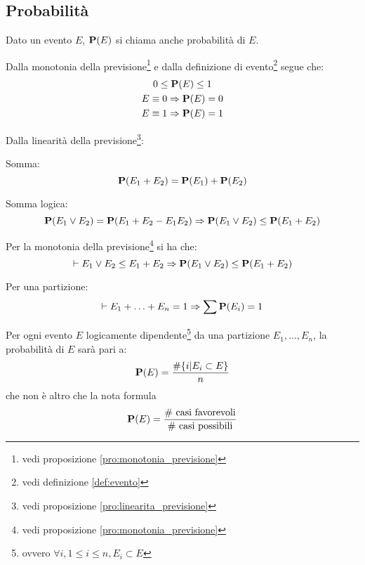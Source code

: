 \subsection{Probabilità}
\begin{definition}[Probabilità]\label{def:probabilita}
  Dato un evento \( E \), \( \mathbf{P}(E) \) si chiama anche probabilità di \( E \).
\end{definition}

\begin{proposition}
  Dalla monotonia della previsione\footnote{vedi proposizione \ref{pro:monotonia_previsione}} e dalla definizione di evento\footnote{vedi definizione \ref{def:evento}} segue che:
  \begin{gather*}
    0 \le \mathbf{P}(E) \le 1 \\
    E \equiv 0 \Rightarrow \mathbf{P}(E) = 0 \\
    E \equiv 1 \Rightarrow \mathbf{P}(E) = 1
  \end{gather*}
\end{proposition}

\begin{proposition}
  Dalla linearità della previsione\footnote{vedi proposizione \ref{pro:linearita_previsione}}:

  Somma:
  \[ \mathbf{P}(E_1 + E_2) = \mathbf{P}(E_1) + \mathbf{P}(E_2) \]

  Somma logica:
  \[ \mathbf{P}(E_1 \vee E_2) = \mathbf{P}(E_1 + E_2 - E_1 E_2) \Rightarrow \mathbf{P}(E_1 \vee E_2) \le \mathbf{P}(E_1 + E_2) \]
\end{proposition}

Per la monotonia della previsione\footnote{vedi proposizione \ref{pro:monotonia_previsione}} si ha che:
\[ \vdash E_1 \vee E_2 \le E_1 + E_2 \Rightarrow \mathbf{P}(E_1 \vee E_2) \le \mathbf{P}(E_1 + E_2) \]

Per una partizione: %
\[ \vdash E_1 + \ldots + E_n = 1 \Rightarrow \sum \mathbf{P}(E_i) = 1 \]

\begin{proposition}
  Per ogni evento $E$ logicamente dipendente\footnote{ovvero \( \forall i, 1 \le i \le n, E_i \subset E \)} da una partizione \( E_1, \ldots, E_n \), la probabilità di $E$ sarà pari a:
  \[ \mathbf{P}(E) = \frac{\#\{i|E_i \subset E\}}{n} \]
  che non è altro che la nota formula
  \[ \mathbf{P}(E) = \frac{\text{\# casi favorevoli}}{\text{\# casi possibili}} \]
\end{proposition}

